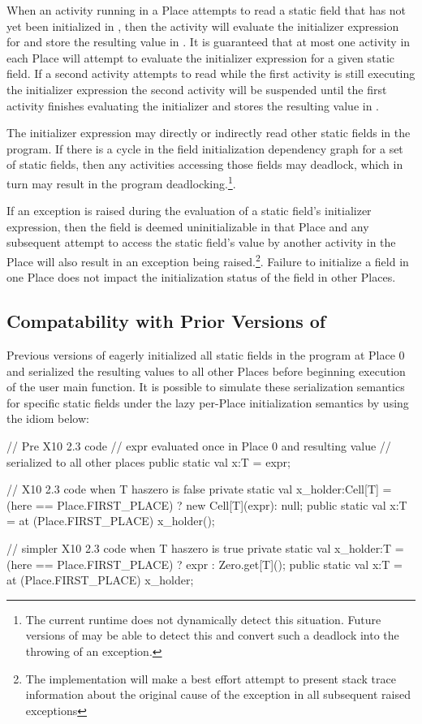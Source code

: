 When an activity running in a Place  attempts to read a static
field  that has not yet been initialized in , then the
activity will evaluate the initializer expression for  and
store the resulting value in . It is guaranteed that at most
one activity in each Place will attempt to evaluate the initializer
expression for a given static field.  If a second activity attempts to
read  while the first activity is still executing the
initializer expression the second activity will be suspended until the
first activity finishes evaluating the initializer and stores the
resulting value in .

The initializer expression may directly or indirectly read other
static fields in the program.  If there is a cycle in the field
initialization dependency graph for a set of static fields, then any
activities accessing those fields may deadlock, which in turn may
result in the program deadlocking.\footnote{The current \Xten{}
  runtime does not dynamically detect this situation. Future versions
  of \Xten may be able to detect this and convert such a deadlock into the
  throwing of an  exception.}.

If an exception is raised during the evaluation of a static field's
initializer expression, then the field is deemed uninitializable in
that Place and any subsequent attempt to access the static field's
value by another activity in the Place will also result in an
exception being raised.\footnote{The implementation will make a best
  effort attempt to present stack trace information about the original
  cause of the exception in all subsequent raised exceptions}.  Failure
to initialize a field in one Place does not impact the initialization
status of the field in other Places.

\subsection{Compatability with Prior Versions of \Xten{}}
Previous versions of \Xten{} eagerly initialized all static fields in
the program at Place 0 and serialized the resulting values to all
other Places before beginning execution of the user main function.  It
is possible to simulate these serialization semantics for specific
static fields under the lazy per-Place initialization semantics
by using the idiom below:

\begin{xten}
// Pre X10 2.3 code
// expr evaluated once in Place 0 and resulting value 
// serialized to all other places
public static val x:T = expr;

// X10 2.3 code when T haszero is false
private static val x_holder:Cell[T] = 
    (here == Place.FIRST_PLACE) ? new Cell[T](expr): null;
public static val x:T = at (Place.FIRST_PLACE) x_holder();

// simpler X10 2.3 code when T haszero is true
private static val x_holder:T = 
    (here == Place.FIRST_PLACE) ? expr : Zero.get[T]();
public static val x:T = at (Place.FIRST_PLACE) x_holder;

\end{xten}

